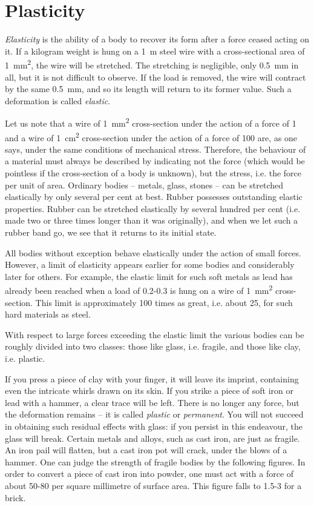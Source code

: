 \section{Plasticity}

\emph{Elasticity} is the ability of a body to recover its form after a force ceased acting on it. If a kilogram weight is hung on a \SI{1}{\meter} steel wire with a cross-sectional area of \SI{1}{\milli\meter\squared}, the wire will be stretched. The stretching is ne­gligible, only  \SI{0.5}{\milli\meter} in all, but it is not difficult to observe. If the load is removed, the wire will contract by the same \SI{0.5}{\milli\meter}, and so its length will return to its former value. Such a deformation is called \emph{elastic}.

Let us note that a wire of \SI{1}{\milli\meter\squared} cross-section under the action of a force of \SI{1}{\kgf} and a wire of \SI{1}{\centi\meter\squared} cross-section under the action of a force of \SI{100}{\kgf} are, as one says, under the same conditions of mechanical stress. Therefore, the behaviour of a material must always be described by indicating not the force (which would be pointless if the cross-section of a body is unknown), but the stress, i.e. the force per unit of area. Ordinary bodies -- metals, glass, stones -- can be stretched elastically by only several per cent at best. Rubber possesses outstanding elastic properties. Rubber can be stretched elastically by several hundred per cent (i.e. made two or three times longer than it was originally), and when we let such a rubber band go, we see that it returns to its initial state.

All bodies without exception behave elastically under the action of small forces. However, a limit of elasticity appears earlier for some bodies and considerably later for others. For example, the elastic limit for such soft metals as lead has already been reached when a load of 0.2-0.3 \si{\kgf} is hung on a wire of \SI{1}{\milli\meter\squared} cross-section. This limit is approximately 100 times as great, i.e. about \SI{25}{\kgf}, for such hard materials as steel.

With respect to large forces exceeding the elastic limit the various bodies can be roughly divided into two classes: those like glass, i.e. fragile, and those like clay, i.e. plastic.

If you press a piece of clay with your finger, it will leave its imprint, containing even the intricate whirls drawn on its skin. If you strike a piece of soft iron or lead with a hammer, a clear trace will be left. There is no longer any force, but the deformation remains -- it is called \emph{plastic} or \emph{permanent}. You will not succeed in ob­taining such residual effects with glass: if you persist in this endeavour, the glass will break. Certain metals and alloys, such as cast iron, are just as fragile. An iron pail will flatten, but a cast iron pot will crack, under the blows of a hammer. One can judge the strength of fragile bodies by the following figures. In order to convert a piece of cast iron into powder, one must act with a force of about 50-80 \si{\kgf} per square millimetre of surface area. This figure falls to 1.5-3 \si{\kgf} for a brick.

